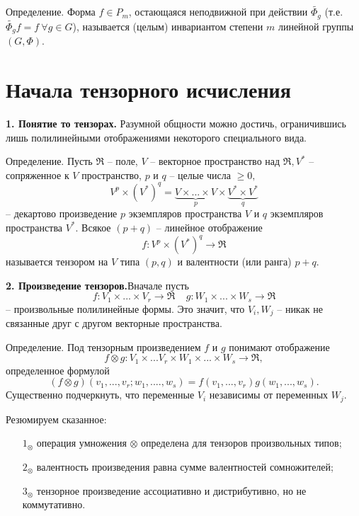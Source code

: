 \documentclass[a4paper, 12pt]{extarticle} %
\begin{document}
Определение. Форма $f \in P_m$, остающаяся неподвижной при действии $\widetilde{\Phi_g}$ (т.е. $\widetilde{\Phi_g}f = f \ \forall g \in G$), называется (целым) инвариантом степени $m$ линейной группы $(G, \Phi)$.

\clearpage
\section*{Начала тензорного исчисления}
\textbf{1. Понятие то тензорах.} Разумной общности можно достичь, ограничившись лишь полилинейными отображениями некоторого специального вида.

Определение. Пусть $\Re$ -- поле, $V$ -- векторное пространство над $\Re, V^*$ -- сопряженное к $V$ пространство, $p$ и $q$ -- целые числа $\geq 0,$
\begin{equation}
    V^p \times (V^*)^q = \underbrace{V \times ... \times V}_{p} \times \underbrace{V^* \times V^*}_{q}
\end{equation}
-- декартово произведение $p$ экземпляров пространства $V$ и $q$ экземпляров пространства $V^*$. Всякое $(p + q)$ -- линейное отображение
\begin{equation}
    f: V^p \times (V^*)^q \to \Re
\end{equation}
называется тензором на $V$ типа $(p, q)$ и валентности (или ранга) $p + q$.

\textbf{2. Произведение тензоров.}Вначале пусть
\begin{equation}
    f: V_1 \times ... \times V_r \to \Re ~~~~~ g: W_1 \times ... \times W_s \to \Re
\end{equation}
-- произвольные полилинейные формы. Это значит, что $V_i, W_j$ -- никак не связанные друг с другом векторные пространства.

Определение. Под тензорным произведением $f$ и $g$ понимают отображение
\begin{equation}
    f \otimes g: V_1 \times ... V_r \times W_1 \times ... \times W_s \to \Re,
\end{equation}
определенное формулой
\begin{equation}
    (f \otimes g)(v_1, ..., v_r; w_1, ...., w_s) = f(v_1, ..., v_r)g(w_1, ..., w_s).
\end{equation}
Существенно подчеркнуть, что переменные $V_i$ независимы от переменных $W_j$.

Резюмируем сказанное:
\begin{enumerate}
    \item [$1_\otimes$] операция умножения $\otimes$ определена для тензоров произвольных типов;
    \item [$2_\otimes$] валентность произведения равна сумме валентностей сомножителей;
    \item [$3_\otimes$] тензорное произведение ассоциативно и дистрибутивно, но не коммутативно.
\end{enumerate}
\end{document}
